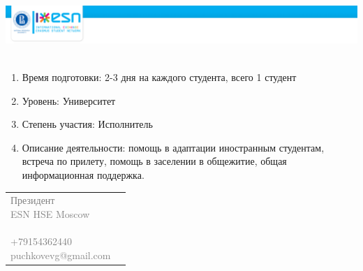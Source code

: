 \documentclass[14pt]{extbook}
\begin{document}
\hspace*{-1.5in}
\includegraphics[height=2.5cm]{top.png}

\bigskip







\bigskip

\normalsize
{}
\begin{enumerate}[noitemsep]
\item Время подготовки: 2-3 дня на каждого студента, всего 1 студент
\item Уровень: Университет
\item Степень участия: Исполнитель
\item Описание деятельности: помощь в адаптации иностранным студентам, встреча
по прилету, помощь в заселении в общежитие, общая информационная поддержка.
\end{enumerate}

\vfill

\textcolor{gray}{
\begin{tabular}{p{7.63cm}p{7.63cm}}
    \parbox[b][][b]{7.63cm}{
        \footnotesize Президент \\
        ESN HSE Moscow \\
        \\
        +79154362440 \\
        puchkovevg@gmail.com \\
    }
    &
    \parbox[b][][b]{7.63cm}{} \\
\end{tabular}
}
\end{document}
